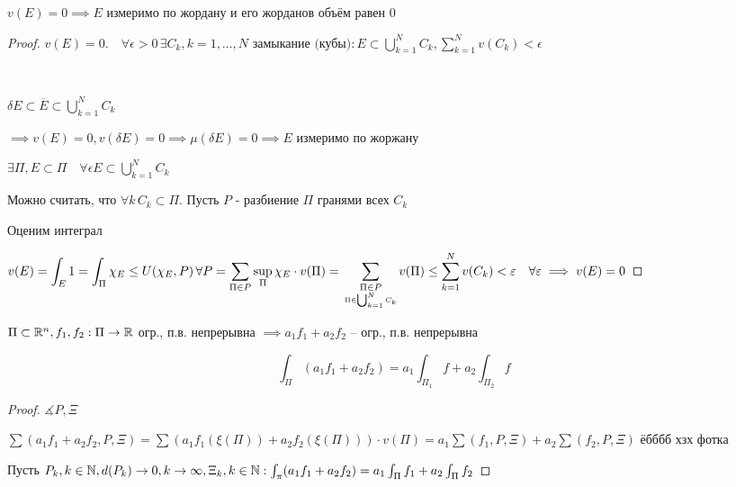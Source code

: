     $v(E) = 0 \implies E$ измеримо по жордану и его жорданов объём равен 0
    \begin{proof}
        $\displaystyle v(E) = 0. \quad\forall \epsilon > 0 \, \exists C_k, k=1,\dotsc,N \text{ замыкание (кубы)}:
        E \subset \bigcup^N_{k=1} C_k, \sum^N_{k=1} v(C_k) < \epsilon
        $

        \par $ $

        $\delta E \subset \overline{E} \subset \bigcup^N_{k=1} C_k$

        $\implies v(E) = 0, v(\delta E) = 0 \implies \mu(\delta E) = 0 \implies E$ 
        измеримо по жоржану
        
        $\exists \Pi, E \subset \Pi \quad \forall \epsilon E \subset \bigcup^N_{k=1}C_k$

        Можно считать, что $\forall k \, C_k \subset \Pi$. Пусть $P$ - разбиение $\Pi$ гранями
        всех $C_k$

        Оценим интеграл 
        
        $\displaystyle v(E) = \int_E 1 = \int_\Pi \chi_E \le 
        U(\chi_E, P) \, \forall P = 
        \sum_{\Pi \in P} \sup_\Pi \chi_E \cdot v(\Pi)
        = \\\sum_{\underset{\Pi \in \bigcup^N_{k=1}C_k}{\Pi \in P}} v(\Pi) \le 
        \sum^N_{k=1} v(C_k) < \epsilon \quad \forall \epsilon\\\\
        \implies v(E) = 0
        $
    \end{proof}

    \begin{lemma} %
        $\Pi \subset \R^n, f_1 ,f_2: \Pi \to \R$ огр., п.в. непрерывна
        $\implies a_1f_1 + a_2f_2$ -- огр., п.в. непрерывна

        $$\int_\Pi(a_1f_1 + a_2f_2) = a_1\int_{\Pi_1} f + a_2\int_{\Pi_2}f$$
    \end{lemma}

    \begin{proof}
        $\measuredangle P, \Xi$ 

        $\sum(a_1f_1 + a_2f_2,P , \Xi) = \sum(a_1f_1(\xi (\Pi))  + a_2f_2(\xi(\Pi)) )\cdot v(\Pi) =
        a_1 \sum(f_1, P, \Xi) + a_2 \sum (f_2, P, \Xi)
        $ ёбббб хзх фотка 

        Пусть $P_k, k \in \N, d(P_k) \to 0, k \to \infty, \Xi_k, k \in \N: 
        \int_\pi(a_1f_1 + a_2f_2) = a_1\int_\Pi f_1 + a_2\int_\Pi f_2
        $
    \end{proof}

